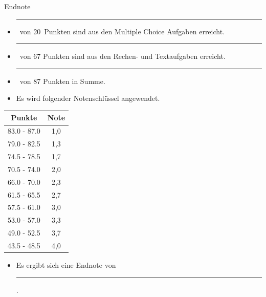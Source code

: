 \documentclass[a4paper, 9pt]{scrartcl}\usepackage[]{graphicx}\usepackage[]{xcolor}
\begin{document}
\begin{graybox}{Endnote}
  \vspace{1Ex}
  \begin{itemize}
  \item[] \rule[0ex]{3em}{.4pt}\, von 20\, Punkten sind aus den Multiple
    Choice Aufgaben erreicht.
  \item[] \rule[0ex]{3em}{.4pt}\, von 67 Punkten sind aus den Rechen- und
    Textaufgaben erreicht. 
  \item[] \rule[0ex]{3em}{.4pt}\, von 87 Punkten in Summe.
  \item[] Es wird folgender Notenschlüssel angewendet.   
  \end{itemize}
  \vspace{1ex}
\begin{center}
  \begin{tabular}[c]{cc}
    \toprule
    \textbf{Punkte}	&	\textbf{Note}	\\
    \midrule
    83.0 - 87.0	&	1,0	\\
    79.0 - 82.5	&	1,3	\\
    74.5 - 78.5	&	1,7	\\
    70.5 - 74.0	&	2,0	\\
    66.0 - 70.0	&	2,3	\\
    61.5 - 65.5	&	2,7	\\
    57.5 - 61.0	&	3,0	\\
    53.0 - 57.0	&	3,3	\\
    49.0 - 52.5	&	3,7	\\
    43.5 - 48.5	&	4,0	\\
    \bottomrule
  \end{tabular}
\end{center}
  \vspace{1ex}
\begin{itemize}
\item[] Es ergibt sich eine Endnote von \rule[0ex]{4em}{.4pt}.
\end{itemize}
  \vspace{1Ex}
\end{graybox}

\newpage
\end{document}
